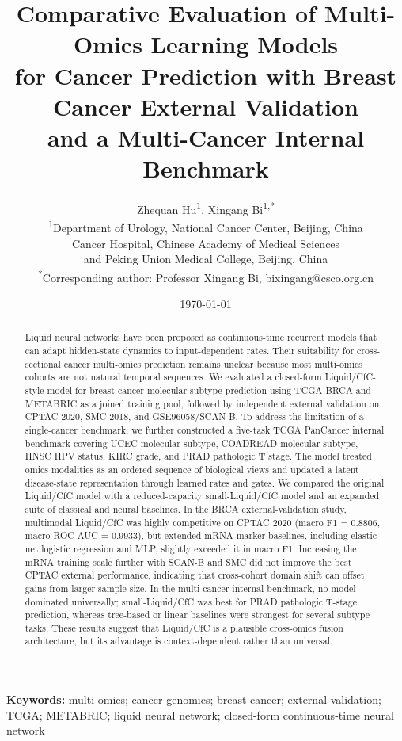 \documentclass[11pt]{article}
\title{Comparative Evaluation of Multi-Omics Learning Models\\for Cancer Prediction with Breast Cancer External Validation\\and a Multi-Cancer Internal Benchmark}
\author{
Zhequan Hu\textsuperscript{1},
Xingang Bi\textsuperscript{1,*}\\
\textsuperscript{1}Department of Urology, National Cancer Center, Beijing, China\\
Cancer Hospital, Chinese Academy of Medical Sciences\\
and Peking Union Medical College, Beijing, China\\
\textsuperscript{*}Corresponding author: Professor Xingang Bi, bixingang@csco.org.cn
}
\date{\today}
\begin{document}
\maketitle

\begin{abstract}
Liquid neural networks have been proposed as continuous-time recurrent models that can adapt hidden-state dynamics to input-dependent rates. Their suitability for cross-sectional cancer multi-omics prediction remains unclear because most multi-omics cohorts are not natural temporal sequences. We evaluated a closed-form Liquid/CfC-style model for breast cancer molecular subtype prediction using TCGA-BRCA and METABRIC as a joined training pool, followed by independent external validation on CPTAC 2020, SMC 2018, and GSE96058/SCAN-B. To address the limitation of a single-cancer benchmark, we further constructed a five-task TCGA PanCancer internal benchmark covering UCEC molecular subtype, COADREAD molecular subtype, HNSC HPV status, KIRC grade, and PRAD pathologic T stage. The model treated omics modalities as an ordered sequence of biological views and updated a latent disease-state representation through learned rates and gates. We compared the original Liquid/CfC model with a reduced-capacity small-Liquid/CfC model and an expanded suite of classical and neural baselines. In the BRCA external-validation study, multimodal Liquid/CfC was highly competitive on CPTAC 2020 (macro F1 = 0.8806, macro ROC-AUC = 0.9933), but extended mRNA-marker baselines, including elastic-net logistic regression and MLP, slightly exceeded it in macro F1. Increasing the mRNA training scale further with SCAN-B and SMC did not improve the best CPTAC external performance, indicating that cross-cohort domain shift can offset gains from larger sample size. In the multi-cancer internal benchmark, no model dominated universally; small-Liquid/CfC was best for PRAD pathologic T-stage prediction, whereas tree-based or linear baselines were strongest for several subtype tasks. These results suggest that Liquid/CfC is a plausible cross-omics fusion architecture, but its advantage is context-dependent rather than universal.
\end{abstract}

\noindent\textbf{Keywords:} multi-omics; cancer genomics; breast cancer; external validation; TCGA; METABRIC; liquid neural network; closed-form continuous-time neural network








\clearpage
\appendix

\clearpage



\end{document}
